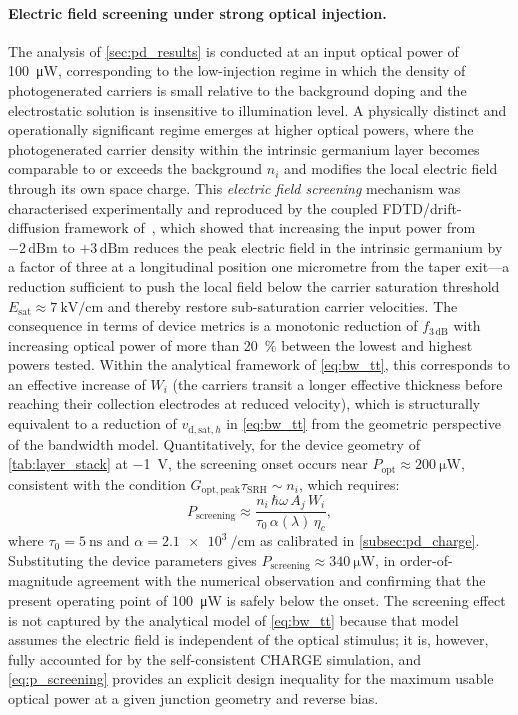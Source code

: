 \paragraph{Electric field screening under strong optical injection.}
The analysis of \cref{sec:pd_results} is conducted at an input optical power
of \SI{100}{\micro\watt}, corresponding to the low-injection regime in which
the density of photogenerated carriers is small relative to the background
doping and the electrostatic solution is insensitive to illumination level.
A physically distinct and operationally significant regime emerges at higher
optical powers, where the photogenerated carrier density within the intrinsic
germanium layer becomes comparable to or exceeds the background $n_i$ and
modifies the local electric field through its own space charge. This
\emph{electric field screening} mechanism was characterised experimentally and
reproduced by the coupled FDTD/drift-diffusion framework of~\cite{Alasio2024},
which showed that increasing the input power from $-2\,\mathrm{dBm}$ to
$+3\,\mathrm{dBm}$ reduces the peak electric field in the intrinsic germanium
by a factor of three at a longitudinal position one micrometre from the taper
exit—a reduction sufficient to push the local field below the carrier saturation
threshold $E_{\mathrm{sat}} \approx \SI{7}{\kilo\volt\per\centi\metre}$ and
thereby restore sub-saturation carrier velocities. The consequence in terms of
device metrics is a monotonic reduction of $f_{3\,\mathrm{dB}}$ with increasing
optical power of more than \SI{20}{\percent} between the lowest and highest
powers tested. Within the analytical framework of \cref{eq:bw_tt}, this
corresponds to an effective increase of $W_i$ (the carriers transit a longer
effective thickness before reaching their collection electrodes at reduced
velocity), which is structurally equivalent to a reduction of
$v_{\mathrm{d,sat},h}$ in \cref{eq:bw_tt} from the geometric perspective of
the bandwidth model. Quantitatively, for the device geometry of \cref{tab:layer_stack}
at \SI{-1}{\volt}, the screening onset occurs near
$P_{\mathrm{opt}} \approx \SI{200}{\micro\watt}$, consistent with the
condition $G_{\mathrm{opt,peak}}\tau_{\mathrm{SRH}} \sim n_i$, which requires:
\begin{equation}
    P_{\mathrm{screening}}
    \approx \frac{n_i\,\hbar\omega\,A_j\,W_i}{\tau_0\,\alpha(\lambda)\,\eta_c},
    \label{eq:p_screening}
\end{equation}
where $\tau_0 = \SI{5}{\nano\second}$ and $\alpha = \SI{2.1e3}{\per
\centi\metre}$ as calibrated in \cref{subsec:pd_charge}. Substituting the
device parameters gives $P_{\mathrm{screening}} \approx \SI{340}{\micro\watt}$,
in order-of-magnitude agreement with the numerical observation and confirming
that the present operating point of \SI{100}{\micro\watt} is safely below the
onset. The screening effect is not captured by the analytical model of
\cref{eq:bw_tt} because that model assumes the electric field is independent of
the optical stimulus; it is, however, fully accounted for by the self-consistent
CHARGE simulation, and \cref{eq:p_screening} provides an explicit design
inequality for the maximum usable optical power at a given junction geometry
and reverse bias.

